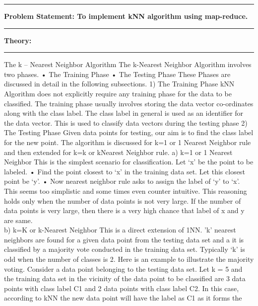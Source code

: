 \documentclass[11pt,article]{memoir}
\begin{document}
\begin{flushleft}
    \pagebreak


\maketitle

\hrule \vspace{0.2cm}
\textbf{Problem Statement: To implement kNN algorithm using map-reduce. }\hrule\vspace{0.2cm}
\textbf{Theory:}\hrule\vspace{0.2cm}
%
The k – Nearest Neighbor Algorithm
The k-Nearest Neighbor Algorithm involves two phases.
• The Training Phase
• The Testing Phase
These Phases are discussed in detail in the following subsections.
1) The Training Phase
kNN Algorithm does not explicitly require any training phase for the data to be classified. The training phase usually
involves storing the data vector co-ordinates along with the class label. The class label in general is used as an identifier
for the data vector. This is used to classify data vectors during the testing phase
2) The Testing Phase Given data points for testing, our aim is to find the class label for the new point. The algorithm is discussed for k=1 or 1 Nearest Neighbor rule and then extended for k=k or kNearest Neighbor rule.
a) k=1 or 1 Nearest Neighbor
This is the simplest scenario for classification. Let ‘x’ be the point to be labeled.
• Find the point closest to ‘x’ in the training data set.
Let this closest point be ‘y’.
• Now nearest neighbor rule asks to assign the label of
‘y’ to ‘x’.
This seems too simplistic and some times even counter intuitive. This reasoning holds only when the number of data points is not very large. If the number of data points is very large, then there is a very high chance that label of x and y are same. \\
\parskip 5mm
b) k=K or k-Nearest Neighbor
This is a direct extension of 1NN. ’k’ nearest neighbors are found for a given data point from the testing data set and a it is classified by a majority vote conducted in the training data set. Typically ‘k’ is odd when the number of classes is 2.
Here is an example to illustrate the majority voting. Consider a data point belonging to the testing data set. Let k =
5 and the training data set in the vicinity of the data point to be classified are 3 data points with class label C1 and 2 data points with class label C2. In this case, according to kNN the new data point will have the label as C1 as it forms the

\end{flushleft}
\end{document}
